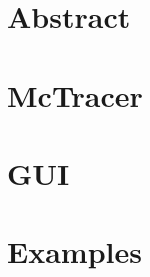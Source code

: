 \documentclass{scrartcl}
\begin{document}
\maketitle
\tableofcontents
\newpage

\section{Abstract} 
\newpage
\section{McTracer} 
\newpage
\section{GUI} 
\newpage
\section{Examples} 
\end{document}
